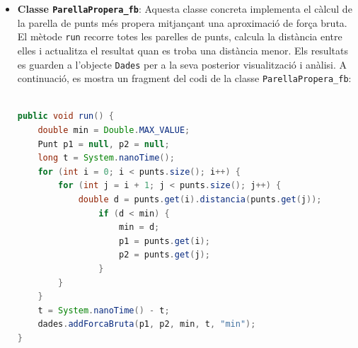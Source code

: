 \documentclass{ieeetj}
\begin{document}
\begin{itemize} \item \textbf{Classe \texttt{ParellaPropera\_fb}}: Aquesta classe concreta implementa el càlcul de la parella de punts més propera mitjançant una aproximació de força bruta. El mètode \texttt{run} recorre totes les parelles de punts, calcula la distància entre elles i actualitza el resultat quan es troba una distància menor. Els resultats es guarden a l'objecte \texttt{Dades} per a la seva posterior visualització i anàlisi. A continuació, es mostra un fragment del codi de la classe \texttt{ParellaPropera\_fb}:
\\\\
\begin{lstlisting}[language=java]
public void run() {
    double min = Double.MAX_VALUE;
    Punt p1 = null, p2 = null;
    long t = System.nanoTime();
    for (int i = 0; i < punts.size(); i++) {
        for (int j = i + 1; j < punts.size(); j++) {
            double d = punts.get(i).distancia(punts.get(j));
                if (d < min) {
                    min = d;
                    p1 = punts.get(i);
                    p2 = punts.get(j);
                }
        }
    }
    t = System.nanoTime() - t;
    dades.addForcaBruta(p1, p2, min, t, "min");
}
\end{lstlisting}

\end{itemize}
\end{document}

